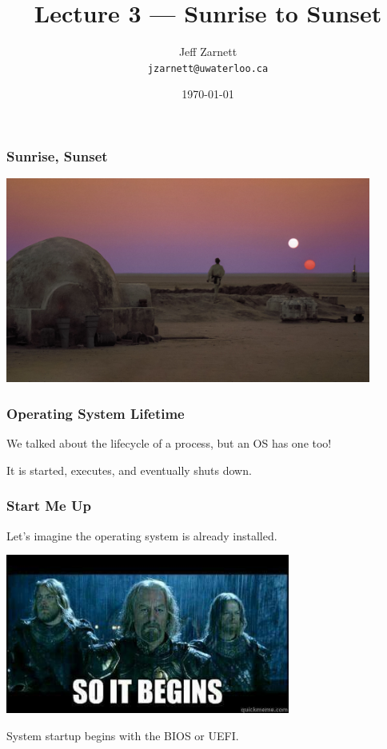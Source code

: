 

\title{Lecture 3 --- Sunrise to Sunset }

\author{Jeff Zarnett \\ \small \texttt{jzarnett@uwaterloo.ca}}
\date{\today}




\begin{frame}
  \titlepage

 \end{frame}

\begin{frame}
\frametitle{Sunrise, Sunset}

\begin{center}
	\includegraphics[width=0.9\textwidth]{images/binary_sunset.jpg}
\end{center}


\end{frame}

\begin{frame}
\frametitle{Operating System Lifetime}
We talked about the lifecycle of a process, but an OS has one too!

It is started, executes, and eventually shuts down.

\end{frame}

\begin{frame}
\frametitle{Start Me Up}

Let's imagine the operating system is already installed.

\begin{center}
	\includegraphics[width=0.7\textwidth]{images/itbegins.jpg}
\end{center}

System startup begins with the BIOS or UEFI.

\end{frame}

